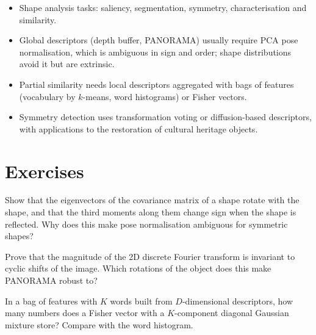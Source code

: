 \begin{keypoints}
\begin{itemize}[leftmargin=*]
  \item Shape analysis tasks: saliency, segmentation, symmetry, characterisation and similarity.
  \item Global descriptors (depth buffer, PANORAMA) usually require PCA pose normalisation, which is
  ambiguous in sign and order; shape distributions avoid it but are extrinsic.
  \item Partial similarity needs local descriptors aggregated with bags of features (vocabulary by
  $k$-means, word histograms) or Fisher vectors.
  \item Symmetry detection uses transformation voting or diffusion-based descriptors, with
  applications to the restoration of cultural heritage objects.
\end{itemize}
\end{keypoints}

\section*{Exercises}
\begin{exercise}
Show that the eigenvectors of the covariance matrix of a shape rotate with the shape, and that the
third moments along them change sign when the shape is reflected. Why does this make pose
normalisation ambiguous for symmetric shapes?
\end{exercise}
\begin{exercise}
Prove that the magnitude of the 2D discrete Fourier transform is invariant to cyclic shifts of the
image. Which rotations of the object does this make PANORAMA robust to?
\end{exercise}
\begin{exercise}
In a bag of features with $K$ words built from $D$-dimensional descriptors, how many numbers does a
Fisher vector with a $K$-component diagonal Gaussian mixture store? Compare with the word histogram.
\end{exercise}

